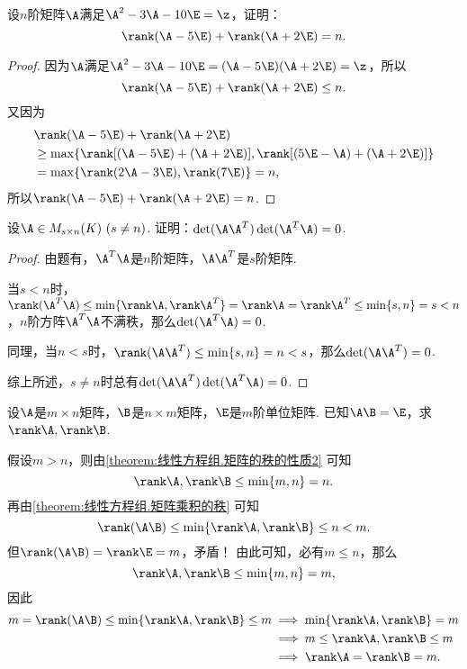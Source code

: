 \begin{example}
设\(n\)阶矩阵\(\A\)满足\(\A^2 - 3 \A - 10 \E = \z\)，证明：\[
	\rank(\A - 5\E) + \rank(\A + 2\E) = n.
\]
\begin{proof}
因为\(\A\)满足\(\A^2 - 3 \A - 10 \E = (\A - 5\E)(\A + 2\E) = \z\)，所以\[
	\rank(\A - 5\E) + \rank(\A + 2\E) \leq n.
\]
又因为\begin{align*}
	&\rank(\A - 5\E) + \rank(\A + 2\E) \\
	&\geq \max\{
		\rank[(\A - 5\E) + (\A + 2\E)],
		\rank[(5\E - \A) + (\A + 2\E)]
		\} \\
	&= \max\{ \rank(2\A - 3\E),\rank(7\E) \}
	= n,
\end{align*}
所以\(\rank(\A - 5\E) + \rank(\A + 2\E) = n\).
\end{proof}
\end{example}

\begin{example}
设\(\A \in M_{s \times n}(K)\ (s \neq n)\).
证明：\(\det(\A \A^T) \det(\A^T \A) = 0\).
\begin{proof}
由题有，\(\A^T \A\)是\(n\)阶矩阵，\(\A \A^T\)是\(s\)阶矩阵.

当\(s < n\)时，\(\rank(\A^T \A) \leq \min\{ \rank\A, \rank\A^T \} = \rank\A = \rank\A^T \leq \min\{s,n\} = s < n\)，\(n\)阶方阵\(\A^T \A\)不满秩，那么\(\det(\A^T \A) = 0\).

同理，当\(n < s\)时，\(\rank(\A \A^T) \leq \min\{s,n\} = n < s\)，那么\(\det(\A \A^T) = 0\).

综上所述，\(s \neq n\)时总有\(\det(\A \A^T) \det(\A^T \A) = 0\).
\end{proof}
\end{example}

\begin{example}
设\(\A\)是\(m \times n\)矩阵，\(\B\)是\(n \times m\)矩阵，\(\E\)是\(m\)阶单位矩阵.
已知\(\A\B = \E\)，求\(\rank\A,\rank\B\).
\begin{solution}
假设\(m > n\)，则由\cref{theorem:线性方程组.矩阵的秩的性质2} 可知\[
\rank\A,\rank\B \leq \min\{m,n\} = n.
\]再由\cref{theorem:线性方程组.矩阵乘积的秩} 可知\[
\rank(\A\B) \leq \min\{\rank\A,\rank\B\} \leq n < m.
\]但\(\rank(\A\B) = \rank\E = m\)，矛盾！
由此可知，必有\(m \leq n\)，那么\[
\rank\A,\rank\B \leq \min\{m,n\} = m,
\]因此\begin{align*}
m = \rank(\A\B) \leq \min\{\rank\A,\rank\B\} \leq m
&\implies
\min\{\rank\A,\rank\B\} = m \\
&\implies
m \leq \rank\A,\rank\B \leq m \\
&\implies \rank\A=\rank\B=m.
\end{align*}
\end{solution}
\end{example}

